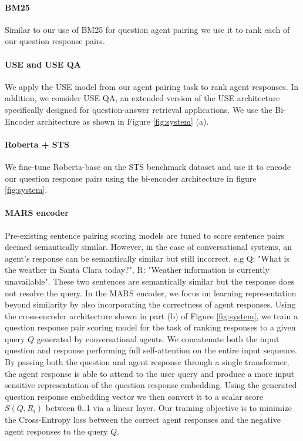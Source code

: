\documentclass[11pt]{article}
\begin{document}
\paragraph{BM25} Similar to our use of BM25 for question agent pairing we use it to rank each of our question response pairs.

\paragraph{USE and USE QA} \cite{yang2019multilingual} We apply the USE model from our agent pairing task to rank agent responses. In addition, we consider USE QA, an extended version of the USE architecture specifically designed for question-answer retrieval applications. We use the Bi-Encoder architecture as shown in Figure \ref{fig:system} (a).

\paragraph{Roberta + STS} We fine-tune Roberta-base on the STS benchmark dataset and use it to encode our question response pairs using the bi-encoder architecture in figure \ref{fig:system}.

\paragraph{MARS encoder} Pre-existing sentence pairing scoring models are tuned to score sentence pairs deemed semantically similar. However, in the case of conversational systems, an agent's response can be semantically similar but still incorrect. e.g Q: "What is the weather in Santa Clara today?", R: "Weather information is currently unavailable". These two sentences are semantically similar but the response does not resolve the query. In the MARS encoder, we focus on learning representation beyond similarity by also incorporating the correctness of agent responses. Using the cross-encoder architecture \cite{Humeau2020Poly-encoders:, reimers-2019-sentence-bert} shown in part (b) of Figure \ref{fig:system}, we train a question response pair scoring model for the task of ranking responses to a given query $Q$ generated by conversational agents. We concatenate both the input question and response performing full self-attention on the entire input sequence. By passing both the question and agent response through a single transformer, the agent response is able to attend to the user query and produce a more input sensitive representation of the question response embedding. Using the generated question response embedding vector we then convert it to a scalar score $S(Q, R_{i})$ between 0..1 via a linear layer. Our training objective is to minimize the Cross-Entropy loss between the correct agent responses and the negative agent responses to the query $Q$.
\end{document}
